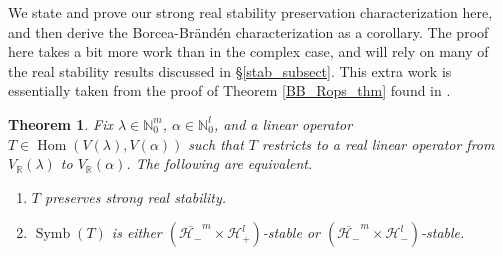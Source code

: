 \documentclass{article}
\newtheorem{theorem}{Theorem}[section]
\theoremstyle{definition}
\theoremstyle{plain}
\newcommand{\R}{\mathbb{R}}
\newcommand{\N}{\mathbb{N}}
\newcommand{\UHP}{\mathcal{H}_+}
\newcommand{\LHP}{\mathcal{H}_-}
\DeclareMathOperator{\Symb}{Symb}
\DeclareMathOperator{\Hom}{Hom}
\begin{document}
We state and prove our strong real stability preservation characterization here, and then derive the Borcea-Br{\"a}nd{\'e}n characterization as a corollary. The proof here takes a bit more work than in the complex case, and will rely on many of the real stability results discussed in \S\ref{stab_subsect}. This extra work is essentially taken from the proof of Theorem \ref{BB_Rops_thm} found in \cite{bb1}.

\begin{theorem}\label{Rops_graces}
    Fix $\lambda \in \N_0^m$, $\alpha \in \N_0^l$, and a linear operator $T \in \Hom(V(\lambda),V(\alpha))$ such that $T$ restricts to a real linear operator from $V_\R(\lambda)$ to $V_\R(\alpha)$. The following are equivalent.
    \begin{enumerate}[label=(\roman*)]
        \item $T$ preserves strong real stability.
        \item $\Symb(T)$ is either $(\overline{\LHP}^m \times \UHP^l)$-stable or $(\overline{\LHP}^m \times \LHP^l)$-stable.
    \end{enumerate}
\end{theorem}
\end{document}
